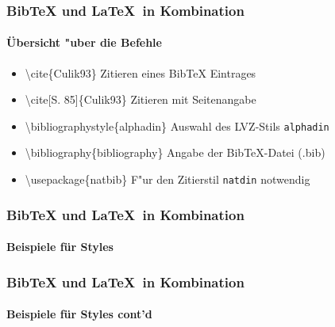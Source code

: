 \begin{frame}
\frametitle{BibTeX und \LaTeX ~in Kombination}
\framesubtitle{\"Ubersicht "uber die Befehle}
\begin{itemize}

\item \color{nounibaredI}\textbackslash cite\color{black}\{Culik93\} \hfill Zitieren eines BibTeX Eintrages\\

\item \color{nounibaredI}\textbackslash cite\color{black}[S. 85]\{Culik93\} \hfill Zitieren mit Seitenangabe\\

\item \color{nounibaredI}\textbackslash bibliographystyle\color{black}\{alphadin\} \hfill Auswahl des LVZ-Stils \glqq \texttt{alphadin}\grqq\\

\item \color{nounibaredI}\textbackslash bibliography\color{black}\{bibliography\} \hfill Angabe der  BibTeX-Datei (.bib)\\

\item \color{nounibaredI}\textbackslash usepackage\color{black}\{natbib\} \hfill F"ur den Zitierstil \texttt{natdin} notwendig\\


\end{itemize}


\end{frame}


\begin{frame}
\frametitle{BibTeX und \LaTeX ~in Kombination}
\framesubtitle{Beispiele für Styles}
\end{frame}


\begin{frame}
\frametitle{BibTeX und \LaTeX ~in Kombination}
\framesubtitle{Beispiele für Styles cont'd}
\end{frame}


